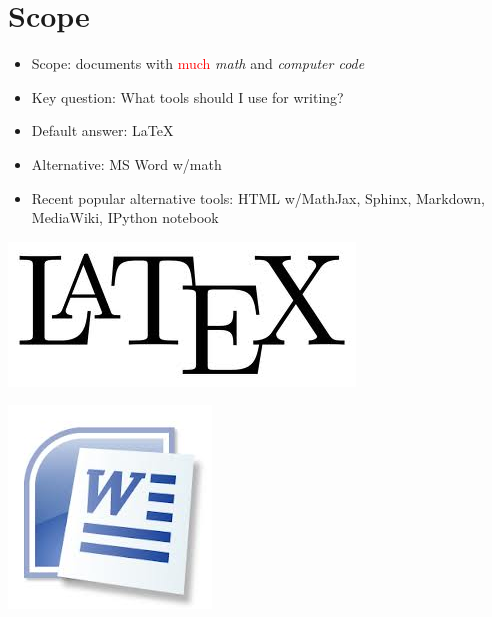 \documentclass[%
oneside,                 %
final,                   %
chapterprefix=true,      %
open=right               %
10pt]{book}
\begin{document}

\section{Scope}


\begin{itemize}
  \item Scope: documents with \textcolor{red}{much} \emph{math} and \emph{computer code}

  \item Key question: What tools should I use for writing?

  \item Default answer: {\LaTeX}

  \item Alternative: MS Word w/math

  \item Recent popular alternative tools: HTML w/MathJax,
    Sphinx, Markdown, MediaWiki, IPython notebook
\end{itemize}

\noindent


\begin{center}  %
  \centerline{\includegraphics[width=0.3\linewidth]{../doc/slides/fig/LaTeX_logo.jpg}}
\end{center}



\begin{center}  %
  \centerline{\includegraphics[width=0.2\linewidth]{../doc/slides/fig/MS_Word_logo.jpg}}
\end{center}

\end{document}
